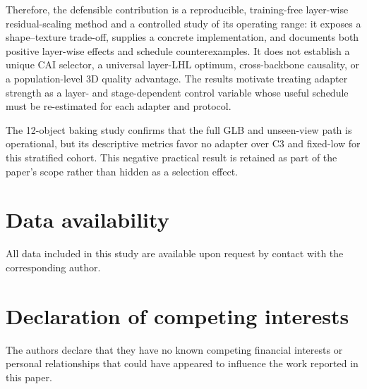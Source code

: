 \documentclass[times,twocolumn,final]{elsarticle}
\begin{document}
Therefore, the defensible contribution is a reproducible, training-free layer-wise residual-scaling method and a controlled study of its operating range: it exposes a shape--texture trade-off, supplies a concrete implementation, and documents both positive layer-wise effects and schedule counterexamples. It does not establish a unique CAI selector, a universal layer-LHL optimum, cross-backbone causality, or a population-level 3D quality advantage. The results motivate treating adapter strength as a layer- and stage-dependent control variable whose useful schedule must be re-estimated for each adapter and protocol.

The 12-object baking study confirms that the full GLB and unseen-view path is operational, but its descriptive metrics favor no adapter over C3 and fixed-low for this stratified cohort. This negative practical result is retained as part of the paper's scope rather than hidden as a selection effect.

\section*{Data availability}

All data included in this study are available upon request by contact with the corresponding author.

\section*{Declaration of competing interests}

The authors declare that they have no known competing financial interests or personal relationships that could have appeared to influence the work reported in this paper.
\end{document}
